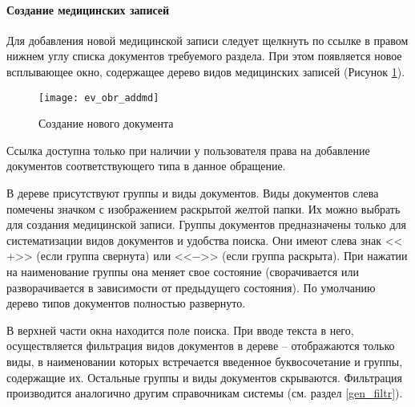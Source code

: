 {\paragraph{Создание медицинских записей} \label{pol_obr_mdnew}

Для добавления новой медицинской записи следует щелкнуть по ссылке  в правом нижнем углу списка документов требуемого раздела. При этом появляется новое всплывающее окно, содержащее дерево видов медицинских записей (Рисунок \ref{img_ev_obr_addmd}).

\begin{figure}[ht]\centering
 \texttt{[image: ev\_obr\_addmd]}
 \caption{Создание нового документа}
 \label{img_ev_obr_addmd}
\end{figure}

\begin{vnim}
 Ссылка  доступна только при наличии у пользователя права на добавление документов соответствующего типа в данное обращение.
\end{vnim} 

В дереве присутствуют группы и виды документов. Виды документов слева помечены значком с изображением раскрытой желтой папки. Их можно выбрать для создания медицинской записи. Группы документов предназначены только для систематизации видов документов и удобства поиска. Они имеют слева знак <<$+$>> (если группа свернута) или <<$-$>> (если группа раскрыта). При нажатии на наименование группы она меняет свое состояние (сворачивается или разворачивается в зависимости от предыдущего состояния). По умолчанию дерево типов документов полностью развернуто. 

В верхней части окна находится поле поиска. При вводе текста в него, осуществляется фильтрация видов документов в дереве -- отображаются только виды, в наименовании которых встречается введенное буквосочетание и группы, содержащие их. Остальные  группы и виды документов скрываются. Фильтрация производится аналогично другим справочникам системы (см. раздел \ref{gen_filtr}). 



}
